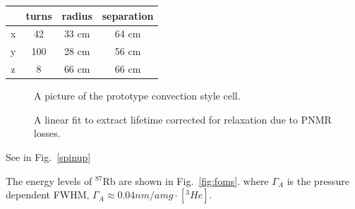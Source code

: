 \documentclass[pdftex,letterpaper,12pt]{report}
\begin{document}
\begin{center}
	\begin{tabular}{ | c | c| c| c | }
		\hline
		& turns & radius & separation \\ \hline
		x & 42 & 33 cm & 64 cm \\ \hline 
		y & 100 & 28 cm & 56 cm \\ \hline
		z & 8 & 66 cm & 66 cm \\
		\hline
	\end{tabular}
\end{center}

\begin{figure}[t!]
	\centering
	\caption{{A picture of the prototype convection style cell.}}
	\label{ConvectionCell}
\end{figure}

\begin{figure}[t!]
	\centering
	\caption{{A linear fit to extract lifetime corrected for relaxation due to PNMR losses.}}
	\label{corrected_T1}
\end{figure}

See in Fig.~\ref{spinup}


	
The energy levels of $^{87}$Rb are shown in Fig.~\ref{fig:foms}.
where $\Gamma_{A}$ is the pressure dependent FWHM, $\Gamma_{A}\approx 0.04nm/amg \cdot [^{3}He]$.


\end{document}
